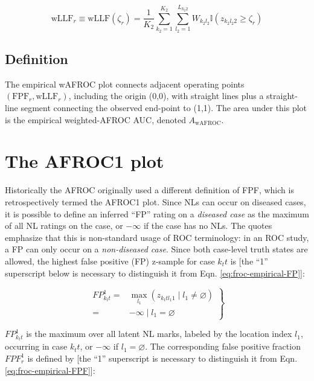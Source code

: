 \documentclass[
]{book}
\begin{document}
\begin{equation}
\text{wLLF}_r \equiv \text{wLLF}\left ( \zeta_r \right ) = \frac{1}{K_2}\sum_{k_2=1}^{K_2}\sum_{l_2=1}^{L_{k_2 2}}W_{k_2 l_2} \mathbb{I}\left ( z_{k_2 l_2 2} \geq \zeta_r \right )
\label{eq:froc-empirical-wLLFr}
\end{equation}

\hypertarget{froc-empirical-definition-auc-wAFROC}{%
\subsection{Definition}\label{froc-empirical-definition-auc-wAFROC}}

The empirical wAFROC plot connects adjacent operating points \(\left ( \text{FPF}_r, \text{wLLF}_r \right )\), including the origin (0,0), with straight lines plus a straight-line segment connecting the observed end-point to (1,1). The area under this plot is the empirical weighted-AFROC AUC, denoted \(A_{\text{wAFROC}}\).

\hypertarget{froc-empirical-AFROC1}{%
\section{The AFROC1 plot}\label{froc-empirical-AFROC1}}

Historically the AFROC originally used a different definition of FPF, which is retrospectively termed the AFROC1 plot. Since NLs can occur on diseased cases, it is possible to define an inferred ``FP'' rating on a \emph{diseased case} as the maximum of all NL ratings on the case, or \(-\infty\) if the case has no NLs. The quotes emphasize that this is non-standard usage of ROC terminology: in an ROC study, a FP can only occur on a \emph{non-diseased case}. Since both case-level truth states are allowed, the highest false positive (FP) z-sample for case \(k_t t\) is {[}the ``1'' superscript below is necessary to distinguish it from Eqn. \eqref{eq:froc-empirical-FP}{]}:

\begin{equation}
\left.
\begin{aligned}
FP_{k_t t}^1 =& \max_{l_1} \left ( z_{k_t t l_1 1 } \mid  l_1 \neq \varnothing \right )\\
=& -\infty \mid l_1 = \varnothing
\end{aligned}
\right \}
\label{eq:froc-empirical-FP1}
\end{equation}

\(FP_{k_t t}^1\) is the maximum over all latent NL marks, labeled by the location index \(l_1\), occurring in case \(k_t t\), or \(-\infty\) if \(l_1 = \varnothing\). The corresponding false positive fraction \(FPF_r^1\) is defined by {[}the ``1'' superscript is necessary to distinguish it from Eqn. \eqref{eq:froc-empirical-FPF}{]}:
\end{document}
